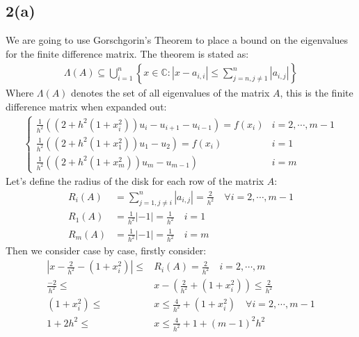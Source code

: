 \documentclass[]{article}
\begin{document}
    \subsection*{2(a)}
        We are going to use Gorschgorin's Theorem to place a bound on the eigenvalues for the finite difference matrix. The theorem is stated as: 
        \begin{align*}\tag{2.a.1}\label{eqn:2.a.1}
            \Lambda (A) \subseteq \bigcup_{i = 1}^n
            \left\lbrace
                x \in \mathbb{C}: | x - a_{i, i}| \le 
                \sum_{j = n, j\neq 1}^{n}| a_{i, j}|
            \right\rbrace
        \end{align*}
        Where $\Lambda(A)$ denotes the set of all eigenvalues of the matrix $A$, this is the finite difference matrix when expanded out: 
        \begin{align*}\tag{2.a.2}\label{eqn:2.a.2}
            \begin{cases}
                \frac{1}{h^2}\left(
                    (2 + h^2(1 + x_i^2))u_i - u_{i + 1} - u_{i - 1}
                \right) = f(x_i) &  i= 2, \cdots, m - 1
                \\
                \frac{1}{h^2}\left(
                    (2 + h^2(1 + x_1^2))u_1 - u_{2}
                \right)
                = f(x_i) &  i = 1
                \\
                \frac{1}{h^2}((2 + h^2(1 + x_m^2))u_m - u_{m - 1}) & i = m
            \end{cases}
        \end{align*}
        Let's define the radius of the disk for each row of the matrix $A$: 
        \begin{align*}\tag{2.a.3}\label{eqn:2.a.3}
            R_i (A) &= \sum_{j = 1, j\neq i}^{n}
                |a_{i, j}| = \frac{2}{h^2} \quad \forall i = 2, \cdots, m - 1
            \\
            R_1(A) &= \frac{1}{h^2}| -1| = \frac{1}{h^2} \quad i = 1
            \\
            R_m(A) &= \frac{1}{h^2}| -1| =  \frac{1}{h^2} \quad i = m
        \end{align*}
        Then we consider case by case, firstly consider: 
        \begin{align*}\tag{2.a.4}\label{eqn:2.a.4}
            \left|
                x - \frac{2}{h^2} - ( 1 + x_i^2)
            \right| 
            \le&  R_i(A) = \frac{2}{h^2} 
            \quad i = 2, \cdots, m
            \\
            \frac{-2}{h^2} \le&  
            x - \left(
                \frac{2}{h^2} + (1 + x_i^2)
            \right) \le \frac{2}{h^2}
            \\
            (1 + x_i^2) \le&  x \le \frac{4}{h^2} + (1 + x_i^2) \quad \forall i = 2, \cdots, m - 1
            \\
            1 + 2h^2 \le& x \le \frac{4}{h^2} + 1 + (m - 1)^2 h^2
        \end{align*}
        
\end{document}
